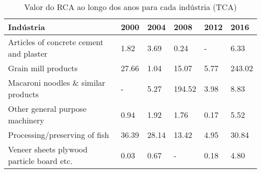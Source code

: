 \begin{table}
\centering
\caption{Valor do RCA ao longo dos anos para cada indústria (TCA)}
\label{tab:ex3-tempo-TCA}
\begin{tabular}{p{6cm}p{1.5cm}p{1.5cm}p{1.5cm}p{1.5cm}p{1.5cm}}
\toprule
                                Indústria &  2000 &  2004 &   2008 & 2012 &   2016 \\
\midrule
  Articles of concrete cement and plaster &  1.82 &  3.69 &   0.24 &    - &   6.33 \\
                      Grain mill products & 27.66 &  1.04 &  15.07 & 5.77 & 243.02 \\
      Macaroni noodles \& similar products &     - &  5.27 & 194.52 & 3.98 &   8.83 \\
          Other general purpose machinery &  0.94 &  1.92 &   1.76 & 0.17 &   5.52 \\
            Processing/preserving of fish & 36.39 & 28.14 &  13.42 & 4.95 &  30.84 \\
Veneer sheets plywood particle board etc. &  0.03 &  0.67 &      - & 0.18 &   4.80 \\
\bottomrule
\end{tabular}
\end{table}

